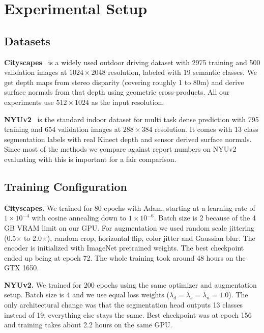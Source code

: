 \documentclass[journal, onecolumn]{IEEEtran}
\begin{document}
\section{Experimental Setup}

\subsection{Datasets}

\textbf{Cityscapes}~\cite{Cordts2016Cityscapes} is a widely used outdoor driving dataset with 2975 training and 500 validation images at $1024\times2048$ resolution, labeled with 19 semantic classes. We get depth maps from stereo disparity (covering roughly 1 to 80m) and derive surface normals from that depth using geometric cross-products. All our experiments use $512\times1024$ as the input resolution.

\textbf{NYUv2}~\cite{silberman2012nyu} is the standard indoor dataset for multi task dense prediction with 795 training and 654 validation images at $288\times384$ resolution. It comes with 13 class segmentation labels with real Kinect depth and sensor derived surface normals. Since most of the methods we compare against report numbers on NYUv2 evaluating with this is important for a fair comparison.

\subsection{Training Configuration}

\textbf{Cityscapes.} We trained for 80 epochs with Adam, starting at a learning rate of $1 \times 10^{-4}$ with cosine annealing down to $1 \times 10^{-6}$. Batch size is 2 because of the 4 GB VRAM limit on our GPU. For augmentation we used random scale jittering (0.5$\times$ to 2.0$\times$), random crop, horizontal flip, color jitter and Gaussian blur. The encoder is initialized with ImageNet pretrained weights. The best checkpoint ended up being at epoch 72. The whole training took around 48 hours on the GTX 1650.

\textbf{NYUv2.} We trained for 200 epochs using the same optimizer and augmentation setup. Batch size is 4 and we use equal loss weights ($\lambda_d = \lambda_s = \lambda_n = 1.0$). The only architectural change was that the segmentation head outputs 13 classes instead of 19; everything else stays the same. Best checkpoint was at epoch 156 and training takes about 2.2 hours on the same GPU.
\end{document}
